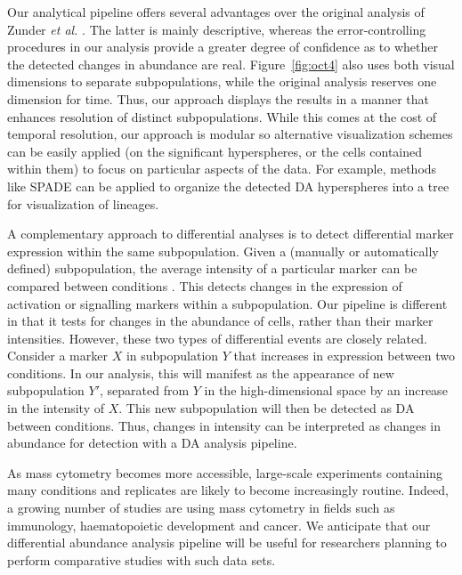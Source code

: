 \documentclass{article}
\begin{document}
Our analytical pipeline offers several advantages over the original analysis of Zunder \emph{et al.} \cite{zunder2015continuous}.
The latter is mainly descriptive, whereas the error-controlling procedures in our analysis provide a greater degree of confidence as to whether the detected changes in abundance are real.
Figure~\ref{fig:oct4} also uses both visual dimensions to separate subpopulations, while the original analysis reserves one dimension for time.
Thus, our approach displays the results in a manner that enhances resolution of distinct subpopulations.
While this comes at the cost of temporal resolution, our approach is modular so alternative visualization schemes can be easily applied (on the significant hyperspheres, or the cells contained within them) to focus on particular aspects of the data.
For example, methods like SPADE can be applied to organize the detected DA hyperspheres into a tree for visualization of lineages.

A complementary approach to differential analyses is to detect differential marker expression within the same subpopulation.
Given a (manually or automatically defined) subpopulation, the average intensity of a particular marker can be compared between conditions \cite{anchang2016visualization,behbehani2015mass}.
This detects changes in the expression of activation or signalling markers within a subpopulation.
Our pipeline is different in that it tests for changes in the abundance of cells, rather than their marker intensities.
However, these two types of differential events are closely related.
Consider a marker $X$ in subpopulation $Y$ that increases in expression between two conditions. 
In our analysis, this will manifest as the appearance of new subpopulation $Y'$, separated from $Y$ in the high-dimensional space by an increase in the intensity of $X$.
This new subpopulation will then be detected as DA between conditions.
Thus, changes in intensity can be interpreted as changes in abundance for detection with a DA analysis pipeline.

As mass cytometry becomes more accessible, large-scale experiments containing many conditions and replicates are likely to become increasingly routine.
Indeed, a growing number of studies are using mass cytometry in fields such as immunology, haematopoietic development and cancer.
We anticipate that our differential abundance analysis pipeline will be useful for researchers planning to perform comparative studies with such data sets.
\end{document}
